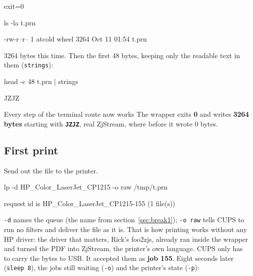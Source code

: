 \documentclass[11pt,a4paper]{article}
\begin{document}
\begin{cmdout}
exit=0
\end{cmdout}
\begin{pane}
ls -la t.prn
\end{pane}
\begin{cmdout}
-rw-r--r-- 1 atcold wheel 3264 Oct 11 01:54 t.prn
\end{cmdout}
3264 bytes this time. Then the first 48 bytes, keeping only the readable text in them (\texttt{strings}):

\begin{pane}
head -c 48 t.prn | strings
\end{pane}
\begin{cmdout}
JZJZ
\end{cmdout}

\begin{insight}{Every step of the terminal route now works}
The wrapper exits \textbf{0} and writes \textbf{3264 bytes} starting with \textbf{\texttt{JZJZ}}, real ZjStream, where before it wrote 0 bytes.
\end{insight}

\subsection{First print}

\begin{alf}
Send out the file to the printer.
\end{alf}

\begin{pane}
lp -d HP_Color_LaserJet_CP1215 -o raw /tmp/t.prn
\end{pane}
\begin{cmdout}
request id is HP_Color_LaserJet_CP1215-155 (1 file(s))
\end{cmdout}

\texttt{-d} names the queue (the name from section~\ref{sec:break1}); \texttt{-o raw} tells CUPS to run no filters and deliver the file as it is. That is how printing works without any HP driver: the driver that matters, Rick's foo2zjs, already ran inside the wrapper and turned the PDF into ZjStream, the printer's own language. CUPS only has to carry the bytes to USB. It accepted them as \textbf{job 155}. Eight seconds later (\texttt{sleep 8}), the jobs still waiting (\texttt{-o}) and the printer's state (\texttt{-p}):
\end{document}
